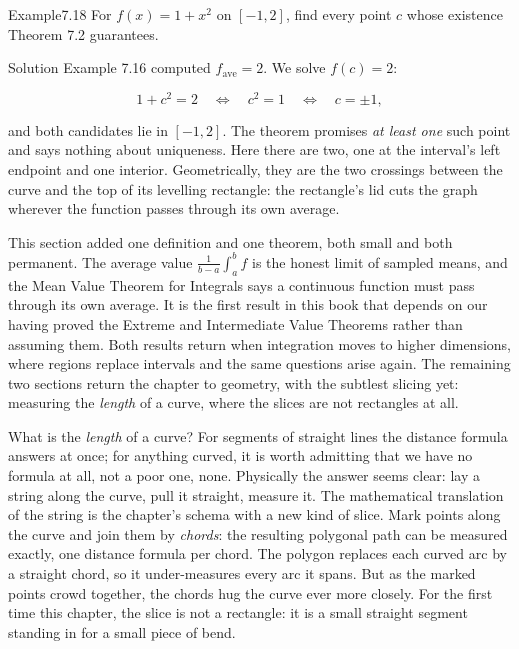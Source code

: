 \documentclass[a4paper,12pt,oneside]{memoir}
\begin{document}
\begin{workedexample}
\begin{envexample}{Example}{7.18}{}
For \(f(x) = 1 + x^{2}\) on \([-1, 2]\), find every point \(c\) whose existence Theorem 7.2 guarantees.
\end{envexample}
\begin{envsolution}{Solution}{}{}
Example 7.16 computed \(f_{\text{ave}} = 2\). We solve \(f(c) = 2\):

\[ 1 + c^{2} = 2 \quad\Longleftrightarrow\quad c^{2} = 1 \quad\Longleftrightarrow\quad c = \pm 1, \]

and both candidates lie in \([-1, 2]\). The theorem promises \emph{at least one} such point and says nothing about uniqueness. Here there are two, one at the interval’s left endpoint and one interior. Geometrically, they are the two crossings between the curve and the top of its levelling rectangle: the rectangle’s lid cuts the graph wherever the function passes through its own average. \qedmark
\end{envsolution}
\end{workedexample}
This section added one definition and one theorem, both small and both permanent. The average value \(\tfrac{1}{b-a}\int_a^b f\) is the honest limit of sampled means, and the Mean Value Theorem for Integrals says a continuous function must pass through its own average. It is the first result in this book that depends on our having proved the Extreme and Intermediate Value Theorems rather than assuming them. Both results return when integration moves to higher dimensions, where regions replace intervals and the same questions arise again. The remaining two sections return the chapter to geometry, with the subtlest slicing yet: measuring the \emph{length} of a curve, where the slices are not rectangles at all.


What is the \emph{length} of a curve? For segments of straight lines the distance formula answers at once; for anything curved, it is worth admitting that we have no formula at all, not a poor one, none. Physically the answer seems clear: lay a string along the curve, pull it straight, measure it. The mathematical translation of the string is the chapter’s schema with a new kind of slice. Mark points along the curve and join them by \emph{chords}: the resulting polygonal path can be measured exactly, one distance formula per chord. The polygon replaces each curved arc by a straight chord, so it under-measures every arc it spans. But as the marked points crowd together, the chords hug the curve ever more closely. For the first time this chapter, the slice is not a rectangle: it is a small straight segment standing in for a small piece of bend.
\end{document}

